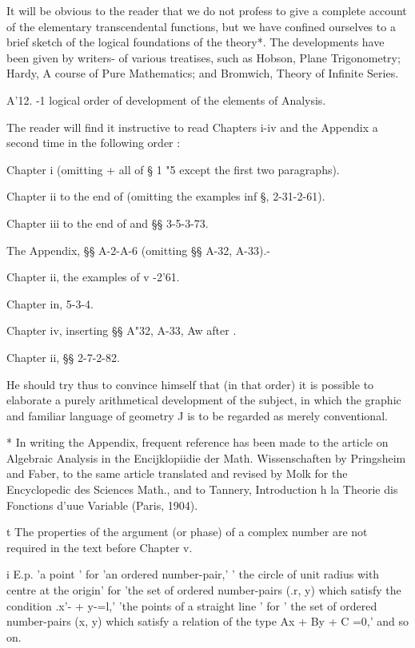 It will be obvious to the reader that we do not profess to give a
complete account of the elementary transcendental functions, but we
have confined ourselves to a brief sketch of the logical foundations
of the theory*. The developments have been given by writers- of
various treatises, such as Hobson, Plane Trigonometry; Hardy, A
course of Pure Mathematics; and Bromwich, Theory of Infinite Series.

A'12. -1 logical order of development of the elements of Analysis.

The reader will find it instructive to read Chapters i-iv and the
Appendix a second time in the following order :

Chapter i (omitting + all of § 1 "5 except the first two paragraphs).

Chapter ii to the end of  (omitting the examples inf §,
2-31-2-61).

Chapter iii to the end of  and §§ 3-5-3-73.

The Appendix, §§ A-2-A-6 (omitting §§ A-32, A-33).-

Chapter ii, the examples of v -2'61.

Chapter in, 5-3-4.

Chapter iv, inserting §§ A"32, A-33, Aw after .

Chapter ii, §§ 2-7-2-82.

He should try thus to convince himself that (in that order) it is
possible to elaborate a purely arithmetical development of the
subject, in which the graphic and familiar language of geometry J is
to be regarded as merely conventional.

* In writing the Appendix, frequent reference has been made to the
article on Algebraic Analysis in the Encijklopiidie der Math.
Wissenschaften by Pringsheim and Faber, to the same article translated
and revised by Molk for the Encyclopedic des Sciences Math., and to
Tannery, Introduction h la Theorie dis Fonctions d'uue Variable
(Paris, 1904).

t The properties of the argument (or phase) of a complex number are
not required in the text before Chapter v.

i E.p. 'a point ' for 'an ordered number-pair,' ' the circle of unit
radius with centre at the origin' for 'the set of ordered number-pairs
(.r, y) which satisfy the condition .x'- + y-=l,' 'the points of a
straight line ' for ' the set of ordered number-pairs (x, y) which
satisfy a relation of the type Ax + By + C =0,' and so on.

